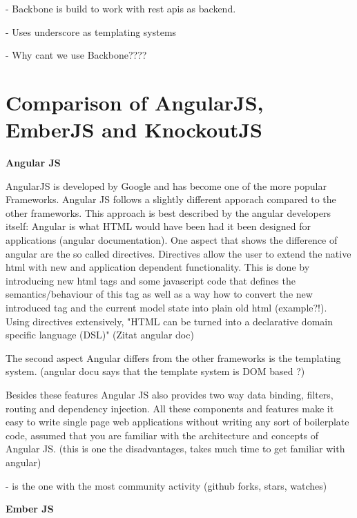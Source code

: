 - Backbone is build to work with rest apis as backend. 


- Uses underscore as templating systems


- Why cant we use Backbone????


\section{Comparison of AngularJS, EmberJS and KnockoutJS}


\textbf{Angular JS}  

AngularJS is developed by Google and has become one of the more popular Frameworks. Angular JS follows a slightly different apporach compared to the other frameworks. This approach is best described by the angular developers itself: Angular is what HTML would have been had it been designed for applications (angular documentation). One aspect that shows the difference of angular are the so called directives. Directives allow the user to extend the native html with new and application dependent functionality.  This is done by introducing new html tags and some javascript code that defines the semantics/behaviour of this tag as well as a way how to convert the new introduced tag and the current model state into plain old html (example?!). Using directives extensively, "HTML can be turned into a declarative domain specific language (DSL)" (Zitat angular doc)
  
The second aspect Angular differs from the other frameworks is the templating system. (angular docu says that the template system is DOM based ?)   

Besides these features Angular JS also provides two way data binding, filters, routing and dependency injection. 
All these components and features make it easy to write single page web applications without writing any sort of boilerplate code, assumed that you are familiar with the architecture and concepts of Angular JS. (this is one the disadvantages, takes much time to get familiar with angular)  

- is the one with the most community activity (github forks, stars, watches) 
	

\textbf{Ember JS}


